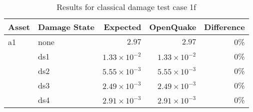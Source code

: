 \begin{table}[htbp]

\centering
\begin{tabular}{ l l r r r }

\hline
\rowcolor{anti-flashwhite}
\bf{Asset} & \bf{Damage State} & \bf{Expected} & \bf{OpenQuake} & \bf{Difference}\\
\hline
a1 & none & $2.97$ & $2.97$ & 0\% \\
   & ds1 & $1.33 \times 10^{-2}$ & $1.33 \times 10^{-2}$ & 0\% \\
   & ds2 & $5.55 \times 10^{-3}$ & $5.55 \times 10^{-3}$ & 0\% \\
   & ds3 & $2.49 \times 10^{-3}$ & $2.49 \times 10^{-3}$ & 0\% \\
   & ds4 & $2.91 \times 10^{-3}$ & $2.91 \times 10^{-3}$ & 0\% \\
\hline
\end{tabular}

\caption{Results for classical damage test case 1f}
\label{tab:result-cd-1f}
\end{table}